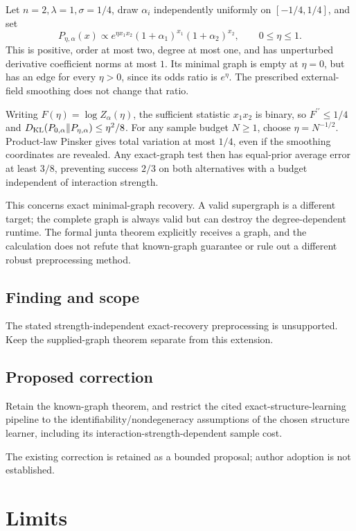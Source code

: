 \documentclass[11pt]{article}
\begin{document}
Let \(n=2,\lambda=1,\sigma=1/4\), draw \(\alpha_i\) independently uniformly on \([-1/4,1/4]\), and set \[P_{\eta,\alpha}(x)\propto e^{\eta x_1x_2}(1+\alpha_1)^{x_1}(1+\alpha_2)^{x_2},\qquad0\leq\eta\leq1.\] This is positive, order at most two, degree at most one, and has unperturbed derivative coefficient norms at most \(1\). Its minimal graph is empty at \(\eta=0\), but has an edge for every \(\eta>0\), since its odds ratio is \(e^\eta\). The prescribed external-field smoothing does not change that ratio.

Writing \(F(\eta)=\log Z_\alpha(\eta)\), the sufficient statistic \(x_1x_2\) is binary, so \(F^{\prime\prime}\leq1/4\) and \(D_{\rm KL}(P_{0,\alpha}\Vert P_{\eta,\alpha})\leq\eta^2/8\). For any sample budget \(N\geq1\), choose \(\eta=N^{-1/2}\). Product-law Pinsker gives total variation at most \(1/4\), even if the smoothing coordinates are revealed. Any exact-graph test then has equal-prior average error at least \(3/8\), preventing success \(2/3\) on both alternatives with a budget independent of interaction strength.

This concerns exact minimal-graph recovery. A valid supergraph is a different target; the complete graph is always valid but can destroy the degree-dependent runtime. The formal junta theorem explicitly receives a graph, and the calculation does not refute that known-graph guarantee or rule out a different robust preprocessing method.

\subsection*{Finding and scope}

The stated strength-independent exact-recovery preprocessing is unsupported. Keep the supplied-graph theorem separate from this extension.

\subsection*{Proposed correction}

Retain the known-graph theorem, and restrict the cited exact-structure-learning pipeline to the identifiability/nondegeneracy assumptions of the chosen structure learner, including its interaction-strength-dependent sample cost.

The existing correction is retained as a bounded proposal; author adoption is not established.

\section*{Limits}
\end{document}
